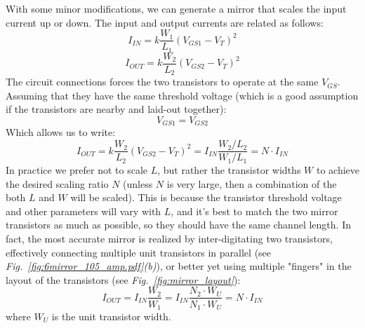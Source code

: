 With some minor modifications, we can generate a mirror that scales the input current up or down. The input and output currents are related as follows:
    \begin{equation}
        {I_{IN}} = k\frac{{{W_1}}}{{{L_1}}}{({V_{GS1}} - {V_T})^2}
    \end{equation}
    \begin{equation}
        {I_{OUT}} = k\frac{{{W_2}}}{{{L_2}}}{({V_{GS2}} - {V_T})^2}
    \end{equation}
The circuit connections forces the two transistors to operate at the same $V_{GS}$.  Assuming that they have the same threshold voltage (which is a good assumption if the transistors are nearby and laid-out together):
    \begin{equation}
        {V_{GS1}} = {V_{GS2}}
    \end{equation}
Which allows us to write:
    \begin{equation}
        {I_{OUT}} = k\frac{{{W_2}}}{{{L_2}}}{({V_{GS2}} - {V_T})^2} = {I_{IN}}\frac{{{W_2}/{L_2}}}{{{W_1}/{L_1}}} = N \cdot {I_{IN}}
    \end{equation}
In practice we prefer not to scale $L$, but rather the transistor widths $W$ to achieve the desired scaling ratio $N$ (unless $N$ is very large, then a combination of the both $L$ and $W$ will be scaled).  This is because the transistor threshold voltage and other parameters will vary with $L$, and it's best to match the two mirror transistors as much as possible, so they should have the same channel length.  In fact, the most accurate mirror is realized by inter-digitating two transistors, effectively connecting multiple unit transistors in parallel \big(see \emph{Fig.~\ref{fig:6mirror_105_amp.pdf}(b)}\big), or better yet using multiple "fingers" in the layout of the transistors \big(see \emph{Fig.~\ref{fig:mirror_layout}}\big):
    \begin{equation}
        {I_{OUT}} =  {I_{IN}}\frac{W_2}{W_1} = {I_{IN}}\frac{N_2\cdot W_U}{N_1\cdot W_U} = N \cdot {I_{IN}}
    \end{equation}
where $W_U$ is the unit transistor width.  
